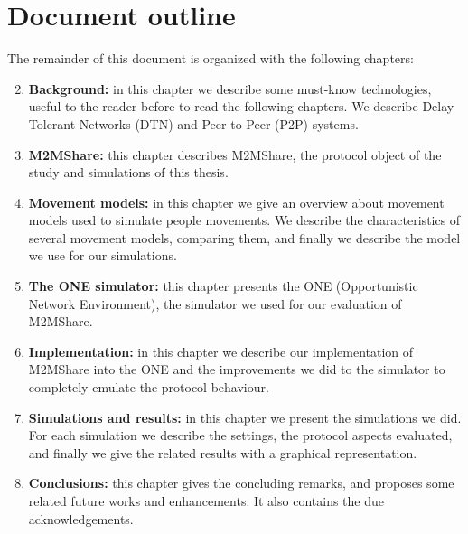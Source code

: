 \section{Document outline}
The remainder of this document is organized with the following chapters:
\begin{enumerate}
\setcounter{enumi}{1}
\item \textbf{Background:} in this chapter we describe some must-know technologies, useful to the reader before to read the following chapters. We describe Delay Tolerant Networks (DTN) and Peer-to-Peer (P2P) systems.
\item \textbf{M2MShare:} this chapter describes M2MShare, the protocol object of the study and simulations of this thesis.
\item \textbf{Movement models:} in this chapter we give an overview about movement models used to simulate people movements. We describe the characteristics of several movement models, comparing them, and finally we describe the model we use for our simulations.
\item \textbf{The ONE simulator:} this chapter presents the ONE (Opportunistic Network Environment), the simulator we used for our evaluation of M2MShare.
\item \textbf{Implementation:} in this chapter we describe our implementation of M2MShare into the ONE and the improvements we did to the simulator to completely emulate the protocol behaviour.
\item \textbf{Simulations and results:} in this chapter we present the simulations we did. For each simulation we describe the settings, the protocol aspects evaluated, and finally we give the related results with a graphical representation.
\item \textbf{Conclusions:}  this chapter gives the concluding remarks, and proposes some related future works and enhancements. It also contains the due acknowledgements.

\end{enumerate}
 

